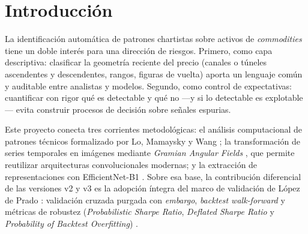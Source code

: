 \documentclass[11pt,a4paper]{article}
\begin{document}
\begin{abstract}
predecir el beneficio—, replicando el veredicto de la primera pata por una vía
independiente. Una tercera pata lleva ambas señales a la medición de riesgo sobre
una cartera de seis materias primas y arroja un resultado igualmente negativo,
documentado junto con los tres defectos de datos que invalidaron una conclusión
previa: la fragilidad del canal \emph{no} anticipa la cola —en los días de mayor
fragilidad ocurren cero excepciones, frente a un \emph{lift} de 3.19 de la
volatilidad EWMA, con correlación $-0.12$ entre ambas señales— y una constante
del mismo nivel medio iguala al \emph{overlay}. Quien sí mejora el VaR es el
filtrado de volatilidad: cobertura del 1.005\%, corrige el agrupamiento de
excepciones del VaR histórico y ahorra un 1.8\% de capital. La geometría del
canal sí aporta valor medible en otros dos ámbitos: la calidad de dato, donde
detecta defectos invisibles a un control convencional de cola y corrige 74.4
puntos porcentuales de distorsión en la contribución al riesgo, y la descripción
interpretable del régimen. El documento cierra con el marco
de aplicación en riesgos: control de capital en cuatro capas y un cuadro de mando
donde el sistema actúa como descriptor de régimen, nunca como señal de inversión.
\end{abstract}

\tableofcontents

\section{Introducción}
La identificación automática de patrones chartistas sobre activos de
\emph{commodities} tiene un doble interés para una dirección de riesgos. Primero,
como capa descriptiva: clasificar la geometría reciente del precio (canales o
túneles ascendentes y descendentes, rangos, figuras de vuelta) aporta un lenguaje
común y auditable entre analistas y modelos. Segundo, como control de
expectativas: cuantificar con rigor qué es detectable y qué no —y si lo detectable
es explotable— evita construir procesos de decisión sobre señales espurias.

Este proyecto conecta tres corrientes metodológicas: el análisis computacional de
patrones técnicos formalizado por Lo, Mamaysky y Wang \cite{lo2000foundations};
la transformación de series temporales en imágenes mediante \emph{Gramian Angular
Fields} \cite{wang2015imaging}, que permite reutilizar arquitecturas
convolucionales modernas; y la extracción de representaciones con EfficientNet-B1
\cite{tan2019efficientnet}. Sobre esa base, la contribución diferencial de las
versiones v2 y v3 es la adopción íntegra del marco de validación de López de
Prado \cite{lopezdeprado2018advances}: validación cruzada purgada con
\emph{embargo}, \emph{backtest walk-forward} y métricas de robustez
(\emph{Probabilistic Sharpe Ratio}, \emph{Deflated Sharpe Ratio} y
\emph{Probability of Backtest Overfitting}) \cite{bailey2012sharpe,
bailey2014deflated,bailey2017probability}.
\end{document}
